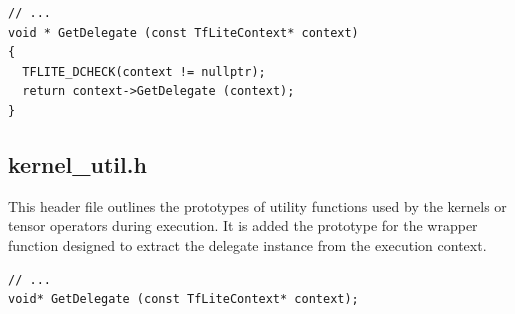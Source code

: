 \begin{verbatim}
// ...
void * GetDelegate (const TfLiteContext* context)
{
  TFLITE_DCHECK(context != nullptr);
  return context->GetDelegate (context);
}
\end{verbatim}

\subsection*{kernel\_util.h}
This header file outlines the prototypes of utility functions used by the kernels or tensor operators during execution. It is added the prototype for the wrapper function designed to extract the delegate instance from the execution context.
\begin{verbatim}
// ...
void* GetDelegate (const TfLiteContext* context);
\end{verbatim}

